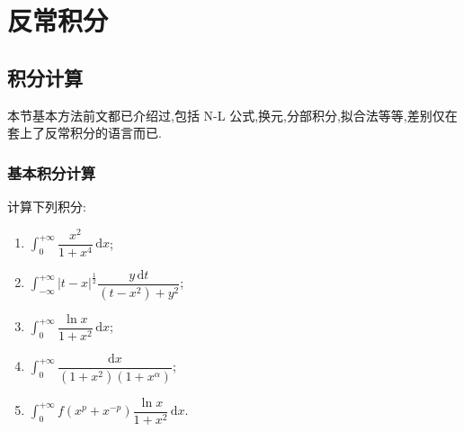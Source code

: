 \setcounter{chapter}{6}
\pagestyle{fancy}

\chapter{反常积分}


\section{积分计算}

本节基本方法前文都已介绍过,包括 N-L 公式,换元,分部积分,拟合法等等,差别仅在套上了反常积分的语言而已.



\subsection{基本积分计算}

\begin{example}
  计算下列积分:
  \begin{enumerate}
    \item $\displaystyle\int_0^{+\infty}\dfrac{x^2}{1+x^4}\,\mathrm{d}x$;
    \item $\displaystyle\int_{-\infty}^{+\infty}|t-x|^{\frac{1}{2}}
            \dfrac{y\,\mathrm{d}t}{(t-x^2)+y^2}$;
    \item $\displaystyle\int_0^{+\infty}\dfrac{\ln x}{1+x^2}\,\mathrm{d}x$;
    \item $\displaystyle\int_0^{+\infty}\dfrac{\mathrm{d}x}{(1+x^2)(1+x^\alpha)}$;
    \item $\displaystyle\int_0^{+\infty}f(x^p+x^{-p})\dfrac{\ln x}{1+x^2}\,\mathrm{d}x$.
  \end{enumerate}
\end{example}
\exampleblank

